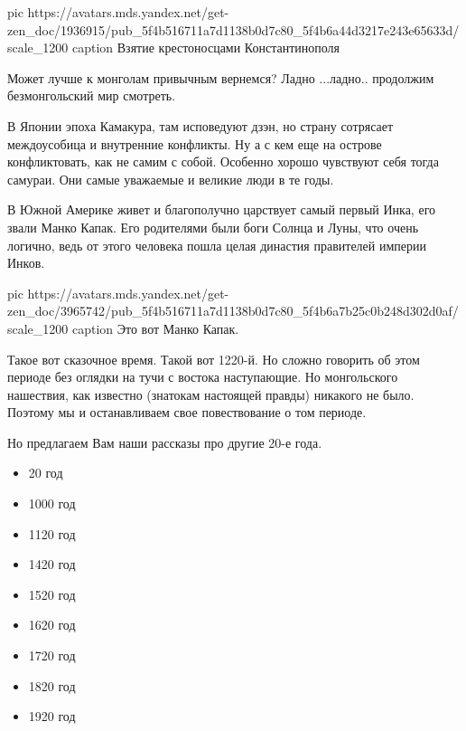 \ifcmt
pic https://avatars.mds.yandex.net/get-zen_doc/1936915/pub_5f4b516711a7d1138b0d7c80_5f4b6a44d3217e243e65633d/scale_1200
caption Взятие крестоносцами Константинополя
\fi

Может лучше к монголам привычным вернемся? Ладно ...ладно.. продолжим
безмонгольский мир смотреть.

В Японии эпоха Камакура, там исповедуют дзэн, но страну сотрясает междоусобица
и внутренние конфликты. Ну а с кем еще на острове конфликтовать, как не самим с
собой. Особенно хорошо чувствуют себя тогда самураи. Они самые уважаемые и
великие люди в те годы.

В Южной Америке живет и благополучно царствует самый первый Инка, его звали
Манко Капак. Его родителями были боги Солнца и Луны, что очень логично, ведь от
этого человека пошла целая династия правителей империи Инков. 

\ifcmt
pic https://avatars.mds.yandex.net/get-zen_doc/3965742/pub_5f4b516711a7d1138b0d7c80_5f4b6a7b25c0b248d302d0af/scale_1200
caption Это вот Манко Капак.
\fi

Такое вот сказочное время. Такой вот 1220-й. Но сложно говорить об этом периоде
без оглядки на тучи с востока наступающие. Но монгольского нашествия, как
известно (знатокам настоящей правды) никакого не было. Поэтому мы и
останавливаем свое повествование о том периоде.

Но предлагаем Вам наши рассказы про другие 20-е года.

\begin{itemize}
  \item 20 год
  \item 1000 год
  \item 1120 год
  \item 1420 год
  \item 1520 год
  \item 1620 год
  \item 1720 год
  \item 1820 год
  \item 1920 год
\end{itemize}
